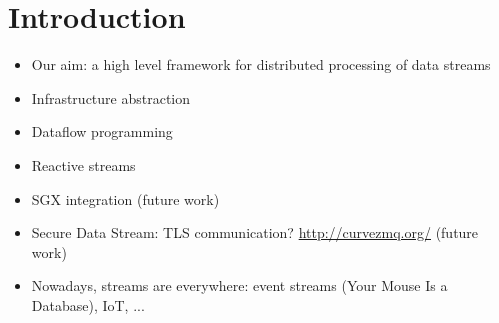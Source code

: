 \section{Introduction}
\label{sec:introduction}

\begin{itemize}
  \item Our aim: a high level framework for distributed processing of data streams
  \item Infrastructure abstraction
  \item Dataflow programming
  \item Reactive streams
  \item SGX integration (future work)
  \item Secure Data Stream: TLS communication? \url{http://curvezmq.org/} (future work)
  \item Nowadays, streams are everywhere: event streams (Your Mouse Is a Database), IoT, ...
\end{itemize}

